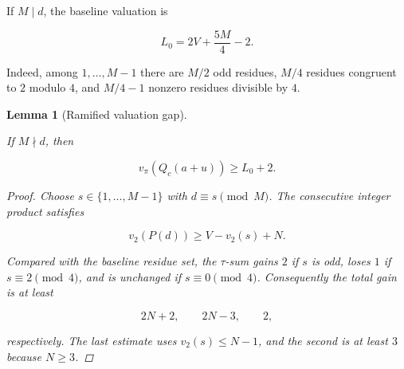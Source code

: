\documentclass[11pt]{article}
\newtheorem{lemma}[theorem]{Lemma}
\numberwithin{equation}{section}
\begin{document}
If $M\mid d$, the baseline valuation is

\nopagebreak[4]
\[
L_0=2V+\frac{5M}{4}-2.
\]

Indeed, among $1,\ldots,M-1$ there are $M/2$ odd residues,
$M/4$ residues congruent to $2$ modulo $4$, and $M/4-1$ nonzero residues
divisible by $4$.

\begin{lemma}[Ramified valuation gap]
\label{lem:ramified-gap}

If $M\nmid d$, then

\nopagebreak[4]
\[
v_\pi(Q_c(a+u))\ge L_0+2.
\]

\begin{proof}

Choose $s\in\{1,\ldots,M-1\}$ with $d\equiv s\pmod M$. The consecutive
integer product satisfies

\nopagebreak[4]
\[
v_2(P(d))\ge V-v_2(s)+N.
\]

Compared with the baseline residue set, the $\tau$-sum gains $2$ if $s$ is
odd, loses $1$ if $s\equiv2\pmod4$, and is unchanged if
$s\equiv0\pmod4$. Consequently the total gain is at least

\nopagebreak[4]
\[
2N+2,
\qquad
2N-3,
\qquad
2,
\]

respectively. The last estimate uses $v_2(s)\le N-1$, and the second is at
least $3$ because $N\ge3$.
\end{proof}

\end{lemma}
\end{document}

